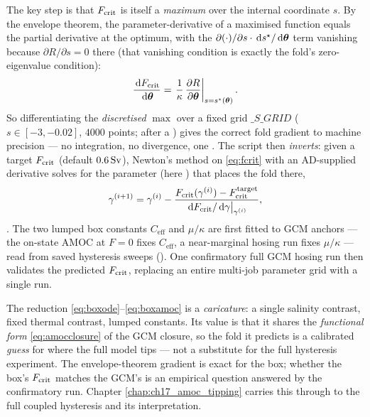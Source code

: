 The key step is that $F_{\mathrm{crit}}$ is itself a \emph{maximum} over the internal
coordinate $s$. By the envelope theorem, the parameter-derivative of a maximised
function equals the partial derivative at the optimum, with the
$\partial(\cdot)/\partial s\cdot\,\mathrm{d} s^\star/\,\mathrm{d}\boldsymbol{\theta}$ term vanishing because
$\partial R/\partial s=0$ there (that vanishing condition is exactly the fold's
zero-eigenvalue condition):
\begin{equation}
  \frac{\,\mathrm{d} F_{\mathrm{crit}}}{\,\mathrm{d} \boldsymbol{\theta}}
  = \left.\frac{1}{\kappa}\,\frac{\partial R}{\partial \boldsymbol{\theta}}\right|_{s=s^\star(\boldsymbol{\theta})} .
  \label{eq:envelope}
\end{equation}
So differentiating the \emph{discretised} $\max$ over a fixed grid $\_S\_GRID$
($s\in[-3,-0.02]$, $4000$ points;  after a ) gives the
correct fold gradient to machine precision --- no integration, no divergence, one
. The script then \emph{inverts}: given a target $F_{\mathrm{crit}}$ (default
$0.6\,\mathrm{Sv}$), Newton's method on \eqref{eq:fcrit} with an AD-supplied derivative
solves for the parameter (here ) that places the fold there,
\begin{equation}
  \gamma^{(i+1)} = \gamma^{(i)}
   - \frac{F_{\mathrm{crit}}(\gamma^{(i)}) - F_{\mathrm{crit}}^{\mathrm{target}}}
          {\,\mathrm{d}F_{\mathrm{crit}}/\,\mathrm{d}\gamma\big|_{\gamma^{(i)}}},
  \label{eq:newton}
\end{equation}
. The two lumped box constants $C_{\mathrm{eff}}$ and $\mu/\kappa$ are
first fitted to GCM anchors --- the on-state AMOC at $F{=}0$ fixes
$C_{\mathrm{eff}}$, a near-marginal hosing run fixes $\mu/\kappa$ --- read from
saved hysteresis sweeps (). One confirmatory full GCM hosing
run then validates the predicted $F_{\mathrm{crit}}$, replacing an entire multi-job parameter
grid with a single run.

\begin{remark}
The reduction \eqref{eq:boxode}--\eqref{eq:boxamoc} is a \emph{caricature}: a
single salinity contrast, fixed thermal contrast, lumped constants. Its value is
that it shares the \emph{functional form} \eqref{eq:amocclosure} of the GCM
closure, so the fold it predicts is a calibrated \emph{guess} for where the full
model tips --- not a substitute for the full hysteresis experiment. The
envelope-theorem gradient is exact for the box; whether the box's $F_{\mathrm{crit}}$
matches the GCM's is an empirical question answered by the confirmatory run.
Chapter \ref{chap:ch17_amoc_tipping} carries this through to the full coupled
hysteresis and its interpretation.
\end{remark}

